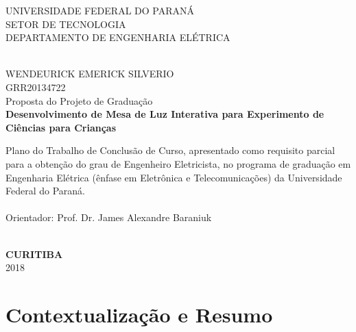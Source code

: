 \documentclass[a4paper,12pt]{article}
\begin{document}
  \begin{titlepage}
    \begin{center}
    \begin{minipage}[t]{0.74\textwidth}
    \vspace{0pt}
    \begin{center}
     UNIVERSIDADE FEDERAL DO PARANÁ \\
     SETOR DE TECNOLOGIA \\
     DEPARTAMENTO DE ENGENHARIA ELÉTRICA
    \end{center}
    \end{minipage}\\[1.5cm]

    {{WENDEURICK EMERICK SILVERIO\\GRR20134722}}\\[3cm]

    {\Large{Proposta do Projeto de Graduação}}\\[1cm]
    {\Large \textbf{Desenvolvimento de Mesa de Luz Interativa para Experimento de Ciências para Crianças}}\\[2.5cm]


      \hspace{.45\textwidth} %
       \begin{minipage}{.5\textwidth}
       Plano do Trabalho de Conclusão de Curso, apresentado como requisito parcial para a obtenção do grau de Engenheiro Eletricista, no programa de graduação em Engenharia Elétrica (ênfase em Eletrônica e Telecomunicações) da Universidade Federal do Paraná.\\
       \\
       Orientador: Prof. Dr. James Alexandre Baraniuk
       
      \end{minipage}
      \\[6.5cm]

      {\textbf{CURITIBA}}\\
      {2018}


    \end{center}
  \end{titlepage}

  \tableofcontents

  \clearpage
  \section{Contextualização e Resumo}
  
\end{document}
